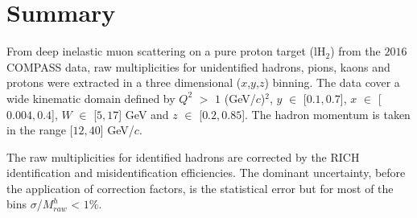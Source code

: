 \section{Summary}

From deep inelastic muon scattering on a pure proton target (lH$_2$) from the $2016$ COMPASS data, raw multiplicities for unidentified hadrons, pions, kaons and protons were extracted in a three dimensional ($x$,$y$,$z$) binning. The data cover a wide kinematic domain defined by $Q^2$ $>$ $1$ (GeV/$c$)$^2$, $y$ $\in$ [$0.1,0.7$], $x$ $\in$ [$0.004,0.4$], $W$ $\in$ [$5,17$] GeV and $z$ $\in$ [$0.2,0.85$]. The hadron momentum is taken in the range [$12,40$] GeV/$c$.

The raw multiplicities for identified hadrons are corrected by the RICH identification and misidentification efficiencies. The dominant uncertainty, before the application of correction factors, is the statistical error but for most of the bins $\sigma$/$M^h_{raw}$ < $1$\%.
